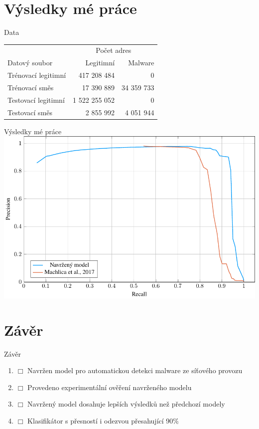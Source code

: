 \documentclass[10pt]{beamer}
\begin{document}
\section{Výsledky mé práce}
\begin{frame}{Data}
	\centering
	\begin{tabular}{lrr}
		\toprule
		\null & \multicolumn{2}{c}{Počet adres} \\
		\cmidrule(l){2-3}
		Datový soubor & Legitimní & Malware \\
		\midrule
		Trénovací legitimní & 417 208 484 & 0 \\
		Trénovací směs & 17 390 889 & 34 359 733 \\
		Testovací legitimní & 1 522 255 052 & 0 \\
		Testovací směs & 2 855 992 & 4 051 944 \\
		\bottomrule
	\end{tabular}
\end{frame}

\begin{frame}{Výsledky mé práce}
	\centering
	\includegraphics[width=0.9\columnwidth]{images/prior_art/prior_art.pdf}
	\nocite{machlica_learning_2017}
\end{frame}

\section{Závěr}
\newcommand{\ballotitem}{\item[\( \Box \)]}
\begin{frame}{Závěr}
	\begin{enumerate}
		\ballotitem Navržen model pro automatickou detekci malware ze síťového provozu
		\ballotitem Provedeno experimentální ověření navrženého modelu
		\ballotitem Navržený model dosahuje lepších výsledků než předchozí modely
		\ballotitem Klasifikátor s přesností i odezvou přesahující 90\%
	\end{enumerate}
\end{frame}
\end{document}
